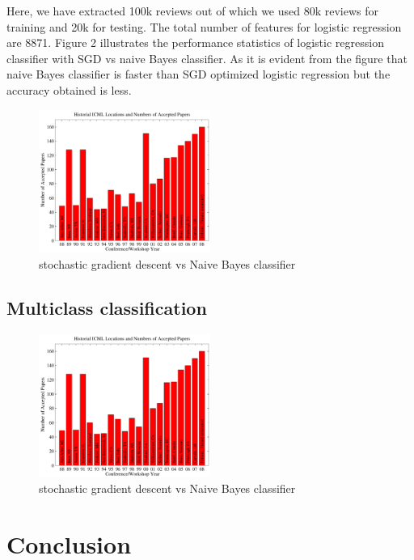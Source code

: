 \documentclass{article}
\begin{document}
Here, we have extracted 100k reviews out of which we used 80k reviews for training and 20k for testing. The total number of features for logistic regression are 8871. Figure 2 illustrates the performance statistics of logistic regression classifier with SGD vs naive Bayes classifier.  As it is evident from the figure that naive Bayes classifier is faster than SGD optimized logistic regression but the accuracy obtained is less.

\begin{figure}[H]
  \caption{stochastic gradient descent vs Naive Bayes classifier}
  \centering
    \includegraphics[width=0.5\textwidth]{icml_numpapers}
\end{figure}



\subsection{Multiclass classification}



\begin{figure}[H]
  \caption{stochastic gradient descent vs Naive Bayes classifier}
  \centering
    \includegraphics[width=0.5\textwidth]{icml_numpapers}
\end{figure}




\section{Conclusion}


\nocite{langley00}



\end{document}

